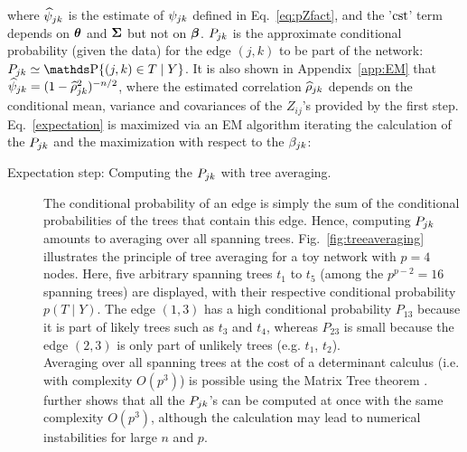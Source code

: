 where $\widehat{\psi}_{jk}$ is the estimate of $\psi_{jk}$ defined in Eq.~\eqref{eq:pZfact}, and the '$\text{cst}$' term depends on ${\boldsymbol{\theta}}$ and ${\boldsymbol{\Sigma}}$ but not on ${\boldsymbol{\beta}}$. 
$P_{jk}$ is the approximate conditional probability (given the data) for the edge $(j, k)$ to be part of the network:
$P_\jk \simeq \prob\{(j, k) \in T \; | \; Y\}$.
It is also shown in Appendix~\ref{app:EM} that $\widehat{\psi}_{jk} = (1-\widehat{\rho}_{jk}^2)^{-n/2}$, where the estimated correlation $\widehat{\rho}_{jk}$ depends on the conditional mean, variance and covariances of the $Z_{ij}$'s provided by the first step.
 Eq.~\eqref{expectation} is maximized via an EM algorithm iterating the calculation of the $P_{jk}$ and the maximization with respect to the $\beta_{jk}$:
\begin{description}

\item[Expectation step: Computing the $P_{jk}$ with tree averaging.] The conditional probability of an edge is simply the sum of the conditional probabilities of the trees that contain this edge. Hence, computing $P_{jk}$ amounts to averaging over all spanning trees.
Fig.~\ref{fig:treeaveraging} illustrates the principle of tree averaging for a toy network with $p=4$ nodes. Here, five arbitrary spanning trees $t_1$ to $t_5$ (among the $p^{p-2} = 16$ spanning trees) are displayed, with their respective conditional probability $p(T \mid Y)$. 
The edge $(1, 3)$ has a high conditional probability $P_{13}$ because it is part of likely trees such as $t_3$ and $t_4$, whereas $P_{23}$ is small because the edge $(2, 3)$ is only part of unlikely trees (e.g. $t_1$, $t_2$). \\
Averaging over all spanning trees at the cost of a determinant calculus (i.e. with complexity $O(p^3)$) is possible using the Matrix Tree theorem \citep[][recalled as Theorem~\ref{thm:MTT} in Appendix~\ref{app:MTT}]{matrixtree}. 
\citet{kirshner} further shows that all the $P_{jk}$'s can be computed at once with the same complexity $O(p^3)$, although the calculation may lead to numerical instabilities for large $n$ and $p$.




\end{description}
